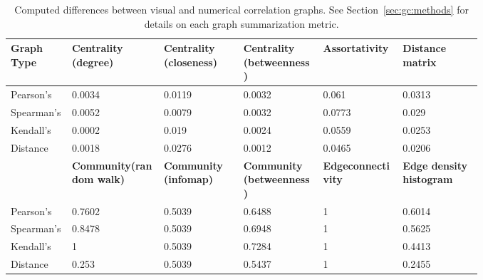 \begin{landscape}
	\tablespacing
	\begin{longtable}{p{0.1\linewidth}p{0.15\linewidth}p{0.13\linewidth}
			p{0.13\linewidth}p{0.13\linewidth}p{0.13\linewidth} }
		
		\caption[Computed differences between visual and numerical correlation 
		graphs.]{Computed differences between visual and numerical correlation 
		graphs. See Section~\ref{sec:gc:methods} for details on each graph 
		summarization metric.} 
		\label{tab:usage:graphdiff}\\
		\toprule
		\textbf{Graph Type} & \textbf{Centrality \newline (degree)} & 
		\textbf{Centrality \newline (closeness)} & 
		\textbf{Centrality \newline (betweenness)} & 
		\textbf{Assortativity} & \textbf{Distance \newline matrix} \\
		\midrule
		\endfirsthead
		
		\bottomrule
		\endlastfoot

		Pearson's & 0.0034 & 0.0119 & 0.0032 & 0.061 & 0.0313\\
		
		Spearman's & 0.0052 & 0.0079 & 0.0032 & 0.0773 & 0.029\\
		
		Kendall's & 0.0002 & 0.019 & 0.0024 & 0.0559 & 0.0253\\
		
		Distance & 0.0018 & 0.0276 & 0.0012 & 0.0465 & 0.0206\\
		
		\midrule
		
		& \textbf{Community\newline (random walk)} & 
		\textbf{Community \newline (infomap)} & 
		\textbf{Community \newline (betweenness)} & 
		\textbf{Edge\newline connectivity} & 
		\textbf{Edge density \newline histogram} \\
		 	
		\midrule
		
		Pearson's & 0.7602 & 0.5039 & 0.6488 & 1 & 0.6014\\
		
		Spearman's & 0.8478 & 0.5039 & 0.6948 & 1 & 0.5625\\
		
		Kendall's & 1 & 0.5039 & 0.7284 & 1 & 0.4413\\
		
		Distance & 0.253 & 0.5039 & 0.5437 & 1 & 0.2455\\
		
	\end{longtable}
	\bodyspacing
\end{landscape}





